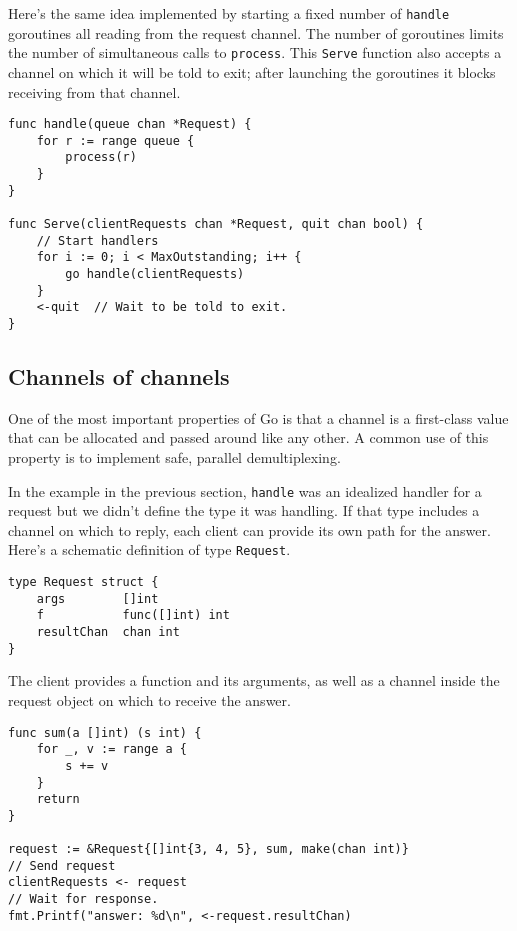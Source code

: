 Here's the same idea implemented by starting a fixed number of
\texttt{handle} goroutines all reading from the request channel. The
number of goroutines limits the number of simultaneous calls to
\texttt{process}. This \texttt{Serve} function also accepts a channel on
which it will be told to exit; after launching the goroutines it blocks
receiving from that channel.

\begin{Verbatim}[frame=single]
func handle(queue chan *Request) {
    for r := range queue {
        process(r)
    }
}

func Serve(clientRequests chan *Request, quit chan bool) {
    // Start handlers
    for i := 0; i < MaxOutstanding; i++ {
        go handle(clientRequests)
    }
    <-quit  // Wait to be told to exit.
}
\end{Verbatim}

\subsection*{Channels of channels}

One of the most important properties of Go is that a channel is a
first-class value that can be allocated and passed around like any
other. A common use of this property is to implement safe, parallel
demultiplexing.

In the example in the previous section, \texttt{handle} was an idealized
handler for a request but we didn't define the type it was handling. If
that type includes a channel on which to reply, each client can provide
its own path for the answer. Here's a schematic definition of type
\texttt{Request}.

\begin{Verbatim}[frame=single]
type Request struct {
    args        []int
    f           func([]int) int
    resultChan  chan int
}
\end{Verbatim}

The client provides a function and its arguments, as well as a channel
inside the request object on which to receive the answer.

\begin{Verbatim}[frame=single]
func sum(a []int) (s int) {
    for _, v := range a {
        s += v
    }
    return
}

request := &Request{[]int{3, 4, 5}, sum, make(chan int)}
// Send request
clientRequests <- request
// Wait for response.
fmt.Printf("answer: %d\n", <-request.resultChan)
\end{Verbatim}

